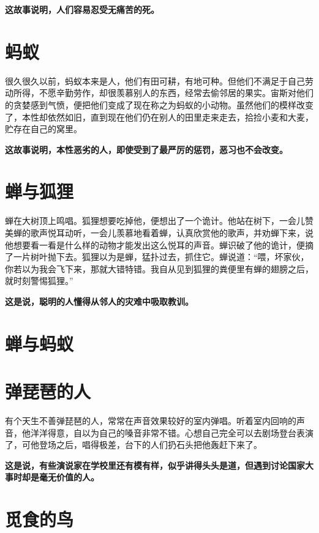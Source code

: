 {\bfseries \color{red}这故事说明，人们容易忍受无痛苦的死。}

\section{蚂蚁}

很久很久以前，蚂蚁本来是人，他们有田可耕，有地可种。但他们不满足于自己劳动所得，不愿辛勤劳作，却很羡慕别人的东西，经常去偷邻居的果实。宙斯对他们的贪婪感到气愤，便把他们变成了现在称之为蚂蚁的小动物。虽然他们的模样改变了，本性却依然如旧，直到现在他们仍在别人的田里走来走去，拾捡小麦和大麦，贮存在自己的窝里。

{\bfseries \color{red}这故事说明，本性恶劣的人，即使受到了最严厉的惩罚，恶习也不会改变。}

\section{蝉与狐狸}

蝉在大树顶上鸣唱。狐狸想要吃掉他，便想出了一个诡计。他站在树下，一会儿赞美蝉的歌声悦耳动听，一会儿羡慕地看着蝉，认真欣赏他的歌声，并劝蝉下来，说他想要看一看是什么样的动物才能发出这么悦耳的声音。蝉识破了他的诡计，便摘了一片树叶抛下去。狐狸以为是蝉，猛扑过去，抓住它。蝉说道：“喂，坏家伙，你若以为我会飞下来，那就大错特错。我自从见到狐狸的粪便里有蝉的翅膀之后，就时刻警惕狐狸。”

{\bfseries \color{red}这是说，聪明的人懂得从邻人的灾难中吸取教训。}

\section{蝉与蚂蚁}



{\bfseries \color{red}}

\section{弹琵琶的人}

有个天生不善弹琵琶的人，常常在声音效果较好的室内弹唱。听着室内回响的声音，他洋洋得意，自以为自己的嗓音非常不错。心想自己完全可以去剧场登台表演了，可他登场之后，唱得极差，台下的人们扔石头把他轰赶下来了。

{\bfseries \color{red}这是说，有些演说家在学校里还有模有样，似乎讲得头头是道，但遇到讨论国家大事时却是毫无价值的人。}

\section{觅食的鸟}

